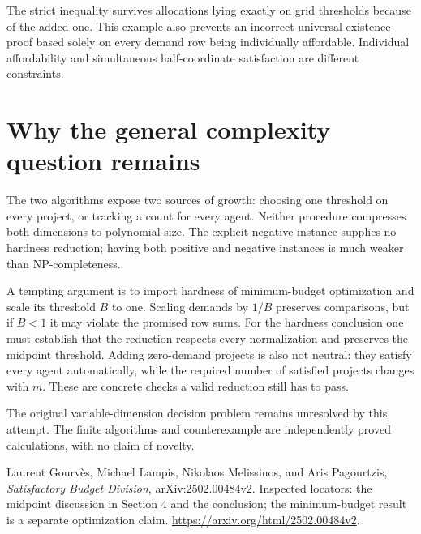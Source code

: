 \documentclass[11pt]{article}
\begin{document}
The strict inequality survives allocations lying exactly on grid
thresholds because of the added one. This example also prevents an
incorrect universal existence proof based solely on every demand row
being individually affordable. Individual affordability and simultaneous
half-coordinate satisfaction are different constraints.

\section*{Why the general complexity question remains}
The two algorithms expose two sources of growth: choosing one threshold
on every project, or tracking a count for every agent. Neither procedure
compresses both dimensions to polynomial size. The explicit negative
instance supplies no hardness reduction; having both positive and
negative instances is much weaker than NP-completeness.

A tempting argument is to import hardness of minimum-budget optimization
and scale its threshold $B$ to one. Scaling demands by $1/B$ preserves
comparisons, but if $B<1$ it may violate the promised row sums. For the
hardness conclusion one must establish that the reduction respects every
normalization and preserves the midpoint threshold. Adding zero-demand
projects is also not neutral: they satisfy every agent automatically,
while the required number of satisfied projects changes with $m$.
These are concrete checks a valid reduction still has to pass.

The original variable-dimension decision problem remains unresolved by
this attempt. The finite algorithms and counterexample are independently
proved calculations, with no claim of novelty.

Laurent Gourv\`es, Michael Lampis, Nikolaos Melissinos, and Aris
Pagourtzis, \emph{Satisfactory Budget Division}, arXiv:2502.00484v2.
Inspected locators: the midpoint discussion in Section 4 and the
conclusion; the minimum-budget result is a separate optimization claim.
\url{https://arxiv.org/html/2502.00484v2}.
\end{document}
